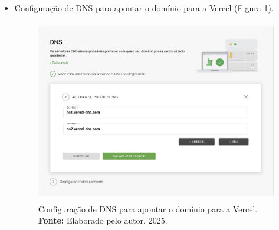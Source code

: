 \begin{itemize}
    \item Configuração de DNS para apontar o domínio para a Vercel (Figura \ref{fig:dns}).
\begin{figure}[H]
    \centering
    \includegraphics[height=8cm, keepaspectratio]{img/Deploy/configuração de dns registrobr.png}
    \caption{ Configuração de DNS para apontar o domínio para a Vercel. \\
        \textbf{Fonte:} Elaborado pelo autor, 2025.}
    \label{fig:dns}
\end{figure}

\end{itemize}



